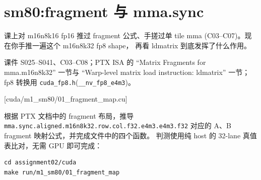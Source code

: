 \documentclass[11pt,a4paper,fontset=fandol]{ctexart}
\begin{document}
\section{sm80:fragment 与 mma.sync}\label{sm80fragment-ux4e0e-mma.sync}

课上对 m16n8k16 fp16 推过 fragment 公式、手搓过单 tile mma
(C03--C07)。现在你手推一遍这个 m16n8k32 fp8 shape， 再看 ldmatrix
到底发挥了什么作用。

\begin{reading}

课件 S025--S041、C03--C08；PTX ISA 的 ``Matrix Fragments for
mma.m16n8k32'' 一节与 ``Warp-level matrix load instruction: ldmatrix''
一节；fp8 转换用
\texttt{cuda\_\allowbreak{}fp8.\allowbreak{}h}(\texttt{\_\allowbreak{}\_\allowbreak{}nv\_\allowbreak{}fp8\_\allowbreak{}e4m3})。

\end{reading}

[cuda/m1\_sm80/01\_fragment\_map.cu]

根据 PTX 文档中的 fragment 布局，推导
\texttt{mma.\allowbreak{}sync.\allowbreak{}aligned.\allowbreak{}m16n8k32.\allowbreak{}row.\allowbreak{}col.\allowbreak{}f32.\allowbreak{}e4m3.\allowbreak{}e4m3.\allowbreak{}f32}
对应的 A、B fragment 映射公式，并完成文件中的四个函数。 判测使用纯 host
的 32-lane 真值表比对，无需 GPU 即可完成：

\begin{verbatim}
cd assignment02/cuda
make run/m1_sm80/01_fragment_map
\end{verbatim}
\end{document}
